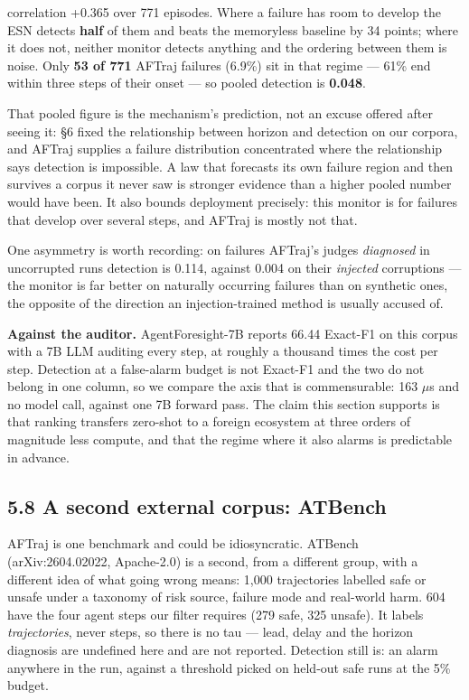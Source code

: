 \documentclass[11pt]{article}
\begin{document}
correlation +0.365 over 771 episodes. Where a failure has room to develop the ESN detects \textbf{half} of them and beats the memoryless baseline by 34 points; where it does not, neither monitor detects anything and the ordering between them is noise. Only \textbf{53 of 771} AFTraj failures (6.9\%) sit in that regime --- 61\% end within three steps of their onset --- so pooled detection is \textbf{0.048}.


That pooled figure is the mechanism's prediction, not an excuse offered after seeing it: \S{}6 fixed the relationship between horizon and detection on our corpora, and AFTraj supplies a failure distribution concentrated where the relationship says detection is impossible. A law that forecasts its own failure region and then survives a corpus it never saw is stronger evidence than a higher pooled number would have been. It also bounds deployment precisely: this monitor is for failures that develop over several steps, and AFTraj is mostly not that.


One asymmetry is worth recording: on failures AFTraj's judges \emph{diagnosed} in uncorrupted runs detection is 0.114, against 0.004 on their \emph{injected} corruptions --- the monitor is far better on naturally occurring failures than on synthetic ones, the opposite of the direction an injection-trained method is usually accused of.


\textbf{Against the auditor.} AgentForesight-7B reports 66.44 Exact-F1 on this corpus with a 7B LLM auditing every step, at roughly a thousand times the cost per step. Detection at a false-alarm budget is not Exact-F1 and the two do not belong in one column, so we compare the axis that is commensurable: 163 $\mu$s and no model call, against one 7B forward pass. The claim this section supports is that ranking transfers zero-shot to a foreign ecosystem at three orders of magnitude less compute, and that the regime where it also alarms is predictable in advance.


\subsection{5.8 A second external corpus: ATBench}


AFTraj is one benchmark and could be idiosyncratic. ATBench (arXiv:2604.02022, Apache-2.0) is a second, from a different group, with a different idea of what going wrong means: 1,000 trajectories labelled safe or unsafe under a taxonomy of risk source, failure mode and real-world harm. 604 have the four agent steps our filter requires (279 safe, 325 unsafe). It labels \emph{trajectories}, never steps, so there is no tau --- lead, delay and the horizon diagnosis are undefined here and are not reported. Detection still is: an alarm anywhere in the run, against a threshold picked on held-out safe runs at the 5\% budget.
\end{document}
